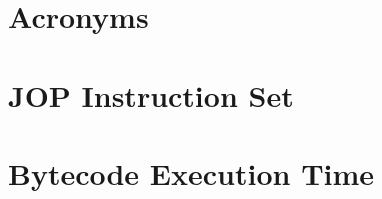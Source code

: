%    

\chapter{Acronyms}
 \label{appx:acro}



\chapter{JOP Instruction Set} \label{appx:jop:instr}


\chapter{Bytecode Execution Time} \label{appx:bytecode}


%

%



